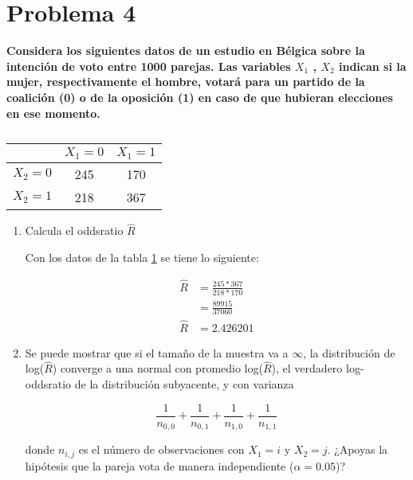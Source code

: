 \section*{Problema 4}

\textbf{Considera los siguientes datos de un estudio en Bélgica sobre la intención de voto entre 1000 parejas. Las variables $X_1$ , $X_2$ indican si la mujer, respectivamente el hombre, votará para un partido de la coalición (0) o de la oposición (1) en caso de que hubieran elecciones en ese momento.}

\begin{table}[H]
	\centering
	\begin{tabular}{c|cc}
		        & $X_1=0$ & $X_1=1$ \\  \hline
		$X_2=0$ & 245     & 170     \\
		$X_2=1$ & 218     & 367
	\end{tabular}
	\caption{}
	\label{table:problema04}
\end{table}

\begin{enumerate}
	\item Calcula el oddsratio $\hat{R}$

	      Con los datos de la tabla \ref{table:problema04} se tiene lo siguiente:

	      \begin{align*}
		      \hat{R} & = \frac{245*367}{218*170} \\
		              & = \frac{89915}{37060}     \\
		      \hat{R} & = 2.426201
	      \end{align*}


	\item Se puede mostrar que si el tamaño de la muestra va a $\infty$, la distribución de log($\hat{R}$) converge a una normal con promedio log($\hat{R}$), el verdadero log-oddsratio de la distribución subyacente, y con varianza

	      \begin{equation*}
		      \frac{1}{n_{0,0}} + \frac{1}{n_{0,1}} + \frac{1}{n_{1,0}} + \frac{1}{n_{1,1}}
	      \end{equation*}

	      donde $n_{i,j}$ es el número de  observaciones con $X_1=i$ y $X_2=j$. ¿Apoyas la hipótesis que la pareja vota de manera independiente ($\alpha=0.05$)?
\end{enumerate}
